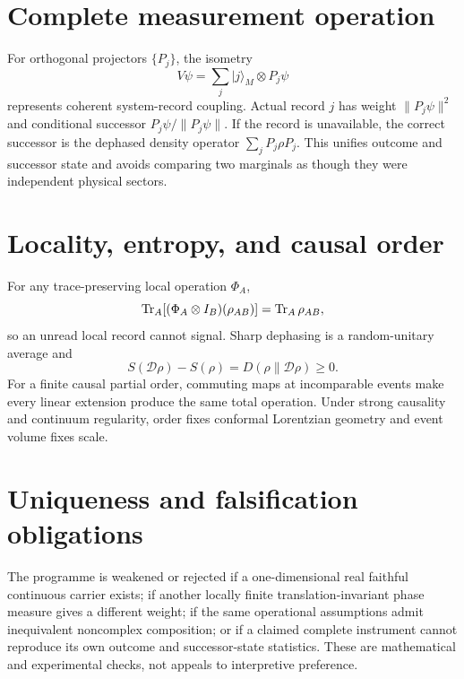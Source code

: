 \documentclass[11pt,a4paper]{article}
\begin{document}
\section{Complete measurement operation}
For orthogonal projectors $\{P_j\}$, the isometry
\begin{equation}
V\psi=\sum_j|j\rangle_M\otimes P_j\psi
\end{equation}
represents coherent system-record coupling. Actual record $j$ has weight $\|P_j\psi\|^2$ and conditional successor $P_j\psi/\|P_j\psi\|$. If the record is unavailable, the correct successor is the dephased density operator $\sum_jP_j\rho P_j$. This unifies outcome and successor state and avoids comparing two marginals as though they were independent physical sectors.

\section{Locality, entropy, and causal order}
For any trace-preserving local operation $\Phi_A$,
\begin{equation}
\operatorname{Tr}_A[(\Phi_A\otimes I_B)(\rho_{AB})]=\operatorname{Tr}_A\rho_{AB},
\end{equation}
so an unread local record cannot signal. Sharp dephasing is a random-unitary average and
\begin{equation}
S(\mathcal D\rho)-S(\rho)=D(\rho\|\mathcal D\rho)\ge0.
\end{equation}
For a finite causal partial order, commuting maps at incomparable events make every linear extension produce the same total operation. Under strong causality and continuum regularity, order fixes conformal Lorentzian geometry and event volume fixes scale.

\section{Uniqueness and falsification obligations}
The programme is weakened or rejected if a one-dimensional real faithful continuous carrier exists; if another locally finite translation-invariant phase measure gives a different weight; if the same operational assumptions admit inequivalent noncomplex composition; or if a claimed complete instrument cannot reproduce its own outcome and successor-state statistics. These are mathematical and experimental checks, not appeals to interpretive preference.
\end{document}
